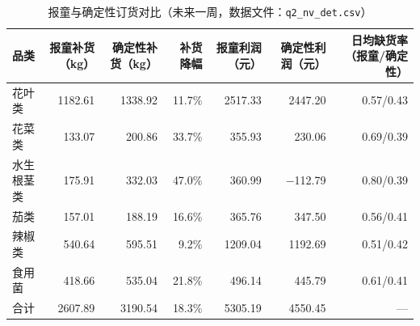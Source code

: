 \begin{table}[htbp]
\centering
\caption{报童与确定性订货对比（未来一周，数据文件：\texttt{q2\_nv\_det.csv}）}
\label{tab:nv_det}
\begin{tabular}{l r r r r r r}
\toprule
品类 & 报童补货（kg） & 确定性补货（kg） & 补货降幅 & 报童利润（元） & 确定性利润（元） & 日均缺货率（报童/确定性） \\
\midrule
花叶类 & 1182.61 & 1338.92 & 11.7\% & 2517.33 & 2447.20 & 0.57/0.43 \\
花菜类 & 133.07 & 200.86 & 33.7\% & 355.93 & 230.06 & 0.69/0.39 \\
水生根茎类 & 175.91 & 332.03 & 47.0\% & 360.99 & −112.79 & 0.80/0.39 \\
茄类 & 157.01 & 188.19 & 16.6\% & 365.76 & 347.50 & 0.56/0.41 \\
辣椒类 & 540.64 & 595.51 & 9.2\% & 1209.04 & 1192.69 & 0.51/0.42 \\
食用菌 & 418.66 & 535.04 & 21.8\% & 496.14 & 445.79 & 0.61/0.41 \\
合计 & 2607.89 & 3190.54 & 18.3\% & 5305.19 & 4550.45 & --- \\
\bottomrule
\end{tabular}
\end{table}
